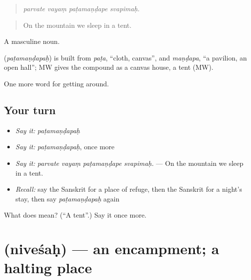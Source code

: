 \begin{quote}
   
\end{quote}

\begin{quote}
\emph{parvate vayaṃ paṭamaṇḍape svapimaḥ.}
\end{quote}

\begin{quote}
On the mountain we sleep in a tent.
\end{quote}

A masculine noun.

\begin{cousinweb}
\textbf{} (\emph{paṭamaṇḍapaḥ}) is built from \emph{paṭa}, \textquotedblleft{}cloth, canvas\textquotedblright{}, and \emph{maṇḍapa}, \textquotedblleft{}a pavilion, an open hall\textquotedblright{}; MW gives the compound as a canvas house, a tent (MW).
\end{cousinweb}

\begin{grammarlens}[title={What you've built}]
One more word for getting around.
\end{grammarlens}

\subsection*{Your turn}
\begin{itemize}
\raggedright
  \item \emph{Say it:} \emph{paṭamaṇḍapaḥ}
  \item \emph{Say it:} \emph{paṭamaṇḍapaḥ}, once more
  \item \emph{Say it:} \emph{parvate vayaṃ paṭamaṇḍape svapimaḥ.} — On the mountain we sleep in a tent.
  \item \emph{Recall:} say the Sanskrit for a place of refuge, then the Sanskrit for a night's stay, then say \emph{paṭamaṇḍapaḥ} again
\end{itemize}

\begin{tcolorbox}[breakable,colback=teal!4,colframe=teal!35!black,title={Before you move on}]
What does  mean? (\textquotedblleft{}A tent\textquotedblright{}.) Say it once more.
\end{tcolorbox}
\section[\texorpdfstring{\sk{निवेशः} (niveśaḥ)}{निवेशः (niveśaḥ)}]{ (niveśaḥ) — an encampment; a halting place}

